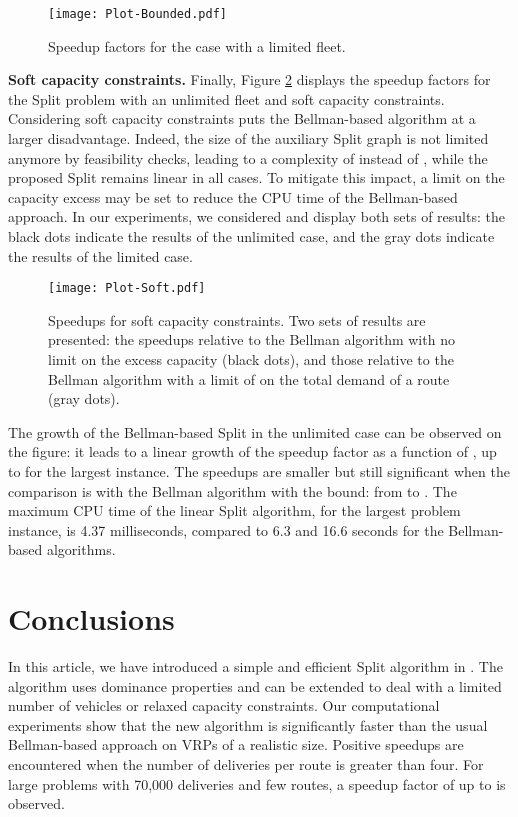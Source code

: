 \documentclass[11pt]{article}
\newcommand{\blue}[1]{{#1}}
\begin{document}
\begin{figure}[htbp]
\centering
\texttt{[image: Plot-Bounded.pdf]}
\caption{Speedup factors for the case with a limited fleet.}
\label{SpeedupBounded}
\end{figure}

\pagebreak

\textbf{Soft capacity constraints.}
Finally, Figure \ref{SpeedupSoft} displays the speedup factors for the Split problem with an unlimited fleet and soft capacity constraints.
\blue{Considering soft capacity constraints puts the Bellman-based algorithm at a larger disadvantage. Indeed, the size of the auxiliary Split graph is not limited anymore by feasibility checks, leading to a complexity of  instead of , while the proposed Split remains linear in all cases. To mitigate this impact, a limit on the capacity excess may be set to reduce the CPU time of the Bellman-based approach. In our experiments, we considered  and display both sets of results}: the black dots indicate the results of the unlimited case, and the gray dots indicate the results of the limited case.

\begin{figure}[htbp]
\centering
\vspace*{-0.2cm}
\texttt{[image: Plot-Soft.pdf]}
\caption{Speedups for soft capacity constraints. Two sets of results are presented: the speedups relative to the Bellman algorithm with no limit on the excess capacity (black dots),  and those relative to the Bellman algorithm with a limit of  on the total demand of a route (gray dots).}
\label{SpeedupSoft}
\end{figure}

The  growth of the Bellman-based Split in the unlimited case can be observed on the figure: it leads to a linear growth of the speedup factor as a function of , up to  for the largest instance.
The speedups are smaller but still significant when the comparison is with the Bellman algorithm with the  bound: from  to . The maximum CPU time of the linear Split algorithm, for the largest problem instance, is 4.37 milliseconds, compared to 6.3 and 16.6 seconds for the Bellman-based algorithms.

\section{Conclusions}
\label{sectionConclusions}

In this article, we have introduced a simple and efficient Split algorithm in .
The algorithm uses dominance properties and can be extended to deal with a limited number of vehicles or relaxed capacity constraints. Our computational experiments show that the new algorithm is significantly faster than the usual Bellman-based approach on VRPs of a realistic size. Positive speedups are encountered when the number of deliveries per route is greater than four. For large problems with 70,000 deliveries and few routes, a speedup factor of up to  is observed.
\end{document}
